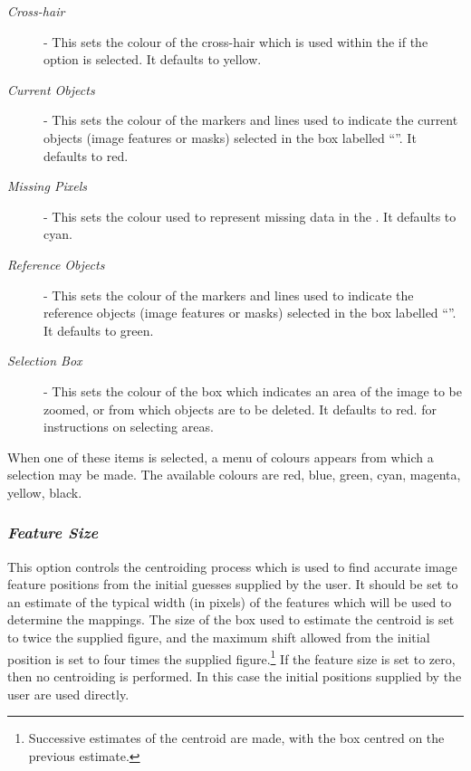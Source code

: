 \documentclass[11pt,nolof]{starlink}
\providecommand{\mylabel}[1] {\xlabel{#1}\label{#1}}
\begin{document}
\begin{description}

\item [\emph{Cross-hair}] - This sets the colour of the cross-hair which
is used within the  if
the  option is
selected. It defaults to yellow.

\item [\emph{Current Objects}] - This sets the colour of the markers and
lines used to indicate the current objects (image features or masks)
selected in the box labelled ``''.
It defaults to red.

\item [\emph{Missing Pixels}] -  This sets the colour used to represent
missing data in the .
It defaults to cyan.

\item [\emph{Reference Objects}] - This sets the colour of the markers and
lines used to indicate the reference objects (image features or masks)
selected in the box labelled ``''.
It defaults to green.

\item [\emph{Selection Box}] - This sets the colour of the box
which indicates an area of the image to be zoomed, or from which objects
are to be deleted. It defaults to red.  for instructions on selecting areas.

\end{description}

When one of these items is selected, a menu of colours appears from which
a selection may be made. The available colours are red, blue, green,
cyan, magenta, yellow, black.

\subsubsection {\mylabel{POLKA_FEATURE_SIZE}\emph{Feature Size}} This option
controls the centroiding process which is used to find accurate image
feature positions from the initial guesses supplied by the user. It
should be set to an estimate of the typical width (in pixels) of the
features which will be used to determine the mappings. The size of the
box used to estimate the centroid is set to twice the supplied figure,
and the maximum shift allowed from the initial position is set to four
times the supplied figure.\footnote{Successive estimates of the centroid
are made, with the box centred on the previous estimate.} If the feature
size is set to zero, then no centroiding is performed. In this case the
initial positions supplied by the user are used directly.
\end{document}

